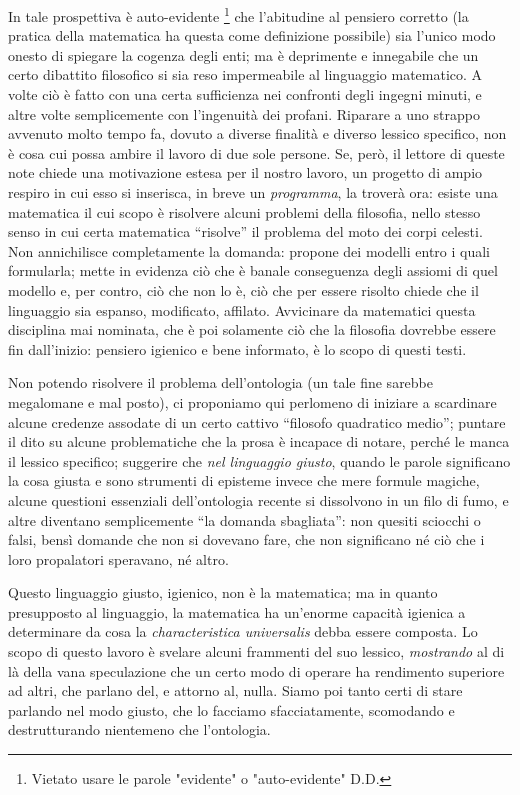 In tale prospettiva è auto-evidente \footnote{Vietato usare le parole "evidente" o "auto-evidente" D.D.} che l'abitudine al pensiero corretto (la pratica della matematica ha questa come definizione possibile) sia l'unico modo onesto di spiegare la cogenza degli enti; ma è deprimente e innegabile che un certo dibattito filosofico si sia reso impermeabile al linguaggio matematico. A volte ciò è fatto con una certa sufficienza nei confronti degli ingegni minuti, e altre volte semplicemente con l'ingenuità dei profani. Riparare a uno strappo avvenuto molto tempo fa, dovuto a diverse finalità e diverso lessico specifico, non è cosa cui possa ambire il lavoro di due sole persone. Se, però, il lettore di queste note chiede una motivazione estesa per il nostro lavoro, un progetto di ampio respiro in cui esso si inserisca, in breve un \emph{programma}, la troverà ora: esiste una matematica il cui scopo è risolvere alcuni problemi della filosofia, nello stesso senso in cui certa matematica ``risolve'' il problema del moto dei corpi celesti. Non annichilisce completamente la domanda: propone dei modelli entro i quali formularla; mette in evidenza ciò che è banale conseguenza degli assiomi di quel modello e, per contro, ciò che non lo è, ciò che per essere risolto chiede che il linguaggio sia espanso, modificato, affilato. Avvicinare da matematici questa disciplina mai nominata, che è poi solamente ciò che la filosofia dovrebbe essere fin dall'inizio: pensiero igienico e bene informato, è lo scopo di questi testi.

Non potendo risolvere il problema dell'ontologia (un tale fine sarebbe megalomane e mal posto), ci proponiamo qui perlomeno di iniziare a scardinare alcune credenze assodate di un certo cattivo ``filosofo quadratico medio''; puntare il dito su alcune problematiche che la prosa è incapace di notare, perché le manca il lessico specifico; suggerire che \emph{nel linguaggio giusto}, quando le parole significano la cosa giusta e sono strumenti di episteme invece che mere formule magiche, alcune questioni essenziali dell'ontologia recente si dissolvono in un filo di fumo, e altre diventano semplicemente ``la domanda sbagliata'': non quesiti sciocchi o falsi, bensì domande che non si dovevano fare, che non significano né ciò che i loro propalatori speravano, né altro.

Questo linguaggio giusto, igienico, non è la matematica; ma in quanto presupposto al linguaggio, la matematica ha un'enorme capacità igienica a determinare da cosa la \emph{characteristica universalis} debba essere composta. Lo scopo di questo lavoro è svelare alcuni frammenti del suo lessico, \emph{mostrando} al di là della vana speculazione che un certo modo di operare ha rendimento superiore ad altri, che parlano del, e attorno al, nulla. Siamo poi tanto certi di stare parlando nel modo giusto, che lo facciamo sfacciatamente, scomodando e destrutturando nientemeno che l'ontologia. %

